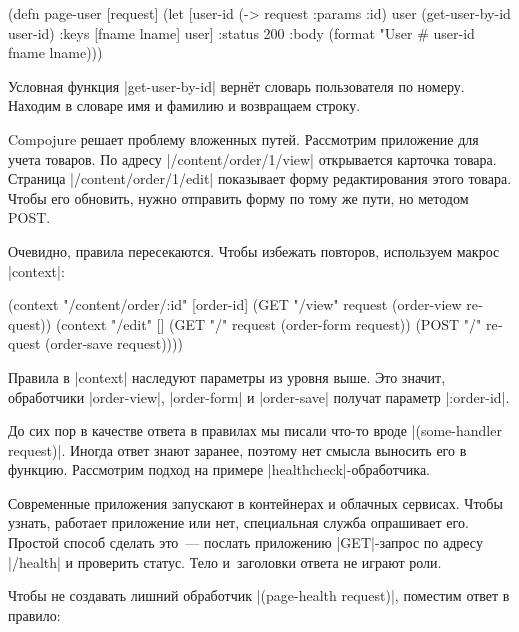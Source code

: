 \begin{english}
  \begin{clojure}
(defn page-user [request]
  (let [user-id (-> request :params :id)
        user (get-user-by-id user-id)
        {:keys [fname lname]} user]
    {:status 200
     :body (format "User #%
                   user-id fname lname)}))
  \end{clojure}
\end{english}

Условная функция \spverb|get-user-by-id| верн\"{е}т словарь пользователя по
номеру. Находим в словаре имя и фамилию и возвращаем строку.

Compojure решает проблему вложенных путей. Рассмотрим приложение для учета
товаров. По адресу \spverb|/content/order/1/view| открывается карточка
товара. Страница \spverb|/content/order/1/edit| показывает форму редактирования
этого товара. Чтобы его обновить, нужно отправить форму по тому же пути, но
методом POST.

Очевидно, правила пересекаются. Чтобы избежать повторов, используем макрос
\spverb|context|:


\begin{english}
  \begin{clojure}
(context "/content/order/:id" [order-id]
  (GET  "/view" request (order-view request))
  (context "/edit" []
    (GET  "/" request (order-form request))
    (POST "/" request (order-save request))))
  \end{clojure}
\end{english}

Правила в \spverb|context| наследуют параметры из уровня выше. Это значит,
обработчики \spverb|order-view|, \spverb|order-form| и \spverb|order-save|
получат параметр \spverb|:order-id|.

До сих пор в качестве ответа в правилах мы писали что-то вроде
\spverb|(some-handler request)|. Иногда ответ знают заранее, поэтому нет смысла
выносить его в функцию. Рассмотрим подход на примере
\spverb|healthcheck|-обработчика.

Современные приложения запускают в контейнерах и облачных сервисах. Чтобы
узнать, работает приложение или нет, специальная служба опрашивает его. Простой
способ сделать это~--- послать приложению \spverb|GET|-запрос по адресу
\spverb|/health| и проверить статус. Тело и~заголовки ответа не играют роли.

Чтобы не создавать лишний обработчик \spverb|(page-health request)|, поместим
ответ в правило:

